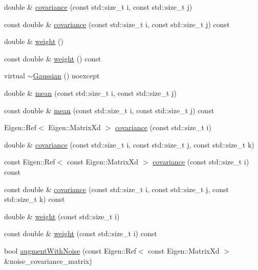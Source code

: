 \begin{DoxyCompactItemize}
double \& \mbox{\hyperlink{classbfl_1_1Gaussian_ac24bc21ce7fbcf4999e88c1957697bd6}{covariance}} (const std\+::size\+\_\+t i, const std\+::size\+\_\+t j)
\item 
const double \& \mbox{\hyperlink{classbfl_1_1Gaussian_af0b2eb137164512658abfeb39d8337ed}{covariance}} (const std\+::size\+\_\+t i, const std\+::size\+\_\+t j) const
\item 
double \& \mbox{\hyperlink{classbfl_1_1Gaussian_aac053b84b9cf54506236bb38a9be7baa}{weight}} ()
\item 
const double \& \mbox{\hyperlink{classbfl_1_1Gaussian_a84a8482a20306e29b508a7235c01f2a6}{weight}} () const
\item 
virtual \mbox{\hyperlink{classbfl_1_1Gaussian_a073652fe6f52bf1833cdb3d73bec792f}{$\sim$\+Gaussian}} () noexcept
\item 
double \& \mbox{\hyperlink{classbfl_1_1GaussianMixture_a21013d54d99ca5bfd1ec566a0815821e}{mean}} (const std\+::size\+\_\+t i, const std\+::size\+\_\+t j)
\item 
const double \& \mbox{\hyperlink{classbfl_1_1GaussianMixture_ac3baa237bc22f156f57d4c02deb4f518}{mean}} (const std\+::size\+\_\+t i, const std\+::size\+\_\+t j) const
\item 
Eigen\+::\+Ref$<$ Eigen\+::\+Matrix\+Xd $>$ \mbox{\hyperlink{classbfl_1_1GaussianMixture_a80a6fa7d9edfc95103236378b4da3f7f}{covariance}} (const std\+::size\+\_\+t i)
\item 
double \& \mbox{\hyperlink{classbfl_1_1GaussianMixture_ad2c74407e682e3b4322df2d0e1cef28e}{covariance}} (const std\+::size\+\_\+t i, const std\+::size\+\_\+t j, const std\+::size\+\_\+t k)
\item 
const Eigen\+::\+Ref$<$ const Eigen\+::\+Matrix\+Xd $>$ \mbox{\hyperlink{classbfl_1_1GaussianMixture_a3cff0f507ed950fe6a5e0aba1bf8467a}{covariance}} (const std\+::size\+\_\+t i) const
\item 
const double \& \mbox{\hyperlink{classbfl_1_1GaussianMixture_a4ca0b098be0fc923f454e73e9dccf78f}{covariance}} (const std\+::size\+\_\+t i, const std\+::size\+\_\+t j, const std\+::size\+\_\+t k) const
\item 
double \& \mbox{\hyperlink{classbfl_1_1GaussianMixture_a44885fb208e33f37015d47f55d02ef50}{weight}} (const std\+::size\+\_\+t i)
\item 
const double \& \mbox{\hyperlink{classbfl_1_1GaussianMixture_a42672f88d9126f018715a4d258a57731}{weight}} (const std\+::size\+\_\+t i) const
\item 
bool \mbox{\hyperlink{classbfl_1_1GaussianMixture_aec4e807341e18c18faed041c41121cb7}{augment\+With\+Noise}} (const Eigen\+::\+Ref$<$ const Eigen\+::\+Matrix\+Xd $>$ \&noise\+\_\+covariance\+\_\+matrix)
\end{DoxyCompactItemize}
